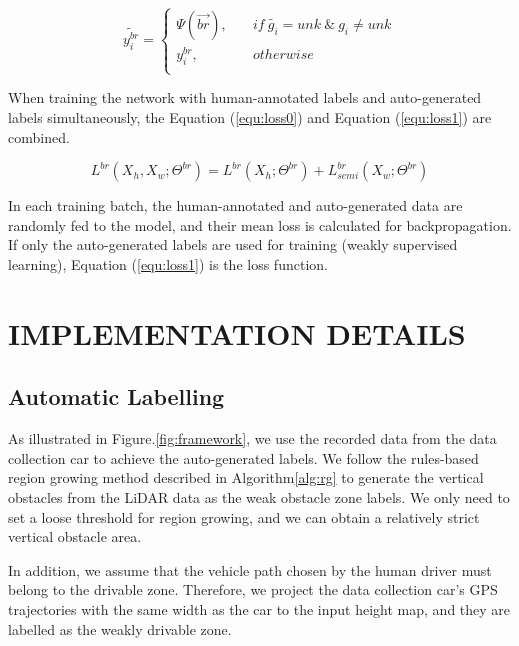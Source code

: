 \documentclass[letterpaper, 10 pt, conference]{ieeeconf}  %
\begin{document}
\vspace{-5mm}
\begin{equation}
\widetilde{y_i^{br}}= 
\left\{
\begin{array}{ll}
\Psi(\vec{br}), &\quad if \ \widetilde{g_i} = unk\ \&\ g_i \neq unk \\ 
y_i^{br}, &\quad otherwise \\
\end{array}
\right.
\end{equation}

When training the network with human-annotated labels and auto-generated labels simultaneously, the Equation (\ref{equ:loss0}) and Equation (\ref{equ:loss1}) are combined.

\vspace{-4mm}
\begin{equation}
\label{equ:loss2}
L^{br}(X_h,X_w;\Theta^{br})=L^{br}(X_h;\Theta^{br})+L^{br}_{semi}(X_w;\Theta^{br})
\end{equation}

In each training batch, the human-annotated and auto-generated data are randomly fed to the model, and their mean loss is calculated for backpropagation. If only the auto-generated labels are used for training (weakly supervised learning), Equation (\ref{equ:loss1}) is the loss function.

\section{IMPLEMENTATION DETAILS} \label{sec:implementationdetails}

\subsection{Automatic Labelling}	\label{sec:autolabel}

As illustrated in Figure.\ref{fig:framework}, we use the recorded data from the data collection car to achieve the auto-generated labels.
We follow the rules-based region growing method described in Algorithm\ref{alg:rg} to generate the vertical obstacles from the LiDAR data as the weak obstacle zone labels. We only need to set a loose threshold for region growing, and we can obtain a relatively strict vertical obstacle area.

In addition, we assume that the vehicle path chosen by the human driver must belong to the drivable zone. Therefore, we project the data collection car's GPS trajectories with the same width as the car to the input height map, and they are labelled as the weakly drivable zone.
\end{document}
